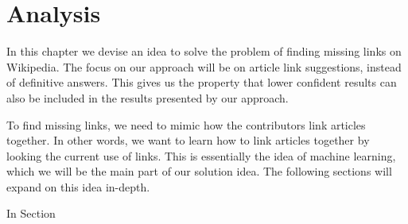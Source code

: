 \chapter{Analysis}\label{chap:analysis}
In this chapter we devise an idea to solve the problem of finding missing links on Wikipedia. 
The focus on our approach will be on article link suggestions, instead of definitive answers. This gives us the property that lower confident results can also be included in the results presented by our approach.

To find missing links, we need to mimic how the contributors link articles together. In other words, we want to learn how to link articles together by looking the current use of links. This is essentially the idea of machine learning, which we will be the main part of our solution idea. The following sections will expand on this idea in-depth.

\begin{chapterorganization}
  \item In Section
 
\end{chapterorganization}






